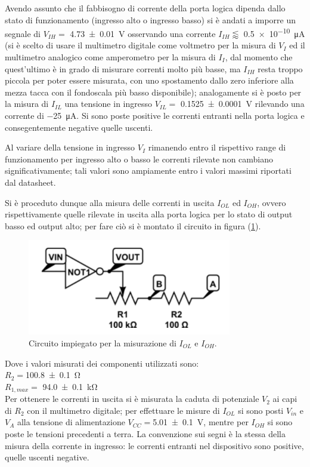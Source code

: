 \documentclass[a4paper,11pt]{article}
\newcommand{\fig}[1]{figura (\ref{f:#1})} %
\begin{document}
Avendo assunto che il fabbisogno di corrente della porta logica dipenda 	dallo stato di funzionamento (ingresso alto o ingresso basso)
si è andati a imporre un segnale di $V_{IH} =$ \SI{4.73\pm 0.01}{\volt} osservando una corrente $I_{IH} \lessapprox$ \SI{0.5e-10}{\micro \ampere} (si è scelto di usare il multimetro digitale come voltmetro per la misura di $V_I$ ed il multimetro analogico come amperometro per la misura di $I_I$, dal momento che quest'ultimo è in grado di misurare correnti molto più basse, ma $I_{IH}$ resta troppo piccola per poter essere misurata, con uno spostamento dallo zero inferiore alla mezza tacca con il fondoscala più basso disponibile);
analogamente si è posto per la misura di  $I_{IL}$ una tensione in ingresso $V_{IL} =$ \SI{0.1525(1)}{\volt} rilevando una corrente di \SI{-25}{\micro \ampere}. Si sono poste positive le correnti entranti nella porta logica e consegentemente negative quelle uscenti.

Al variare della tensione in ingresso $V_{I}$ rimanendo entro il rispettivo range di funzionamento per ingresso alto o basso le correnti rilevate non cambiano significativamente; tali valori sono ampiamente entro i valori massimi riportati dal datasheet.

Si è proceduto dunque alla misura delle correnti in uscita $I_{OL}$ ed $I_{OH}$, ovvero rispettivamente quelle rilevate in uscita alla porta logica per lo stato di output basso ed output alto; per fare ciò si è montato il circuito in \fig{c2}.

\begin{figure}[h]
	\centering
	\includegraphics[scale=0.75]{cir2.png}
	\caption{Circuito impiegato per la misurazione di $I_{OL}$ e $I_{OH}$. }
	\label{f:c2}
\end{figure}

Dove i valori misurati dei componenti utilizzati sono:\\
$R_{2}= $\SI{100.8 \pm 0.1}{\ohm}\\
$R_{1,max}=$ \SI{94.0 \pm 0.1 }{ \kilo \ohm}\\

Per ottenere le correnti in uscita si è misurata la caduta di potenziale  $V_2$ ai capi di $R_{2}$ con il multimetro digitale; per effettuare le misure di $I_{OL}$ si sono posti $V_{in}$ e $V_A$ alla tensione di alimentazione $V_{CC}=$\SI{5.01 \pm 0.1}{\volt}, mentre per $I_{OH}$ si sono poste le tensioni precedenti a terra. La convenzione sui segni è la
stessa della misura della corrente in ingresso: le correnti entranti
nel dispositivo sono positive, quelle uscenti negative.
\end{document}
